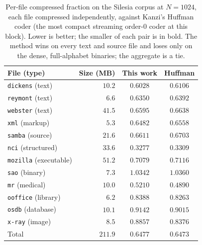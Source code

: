 \documentclass[entropy,article,submit,oneauthor,pdftex]{Definitions/mdpi}
\begin{document}
\begin{table}[ht]
\centering
\renewcommand{\arraystretch}{1.15}
\caption{Per-file compressed fraction on the Silesia corpus at $N{=}1024$, each
file compressed independently, against Kanzi's Huffman coder (the most compact
streaming order-$0$ coder at this block). Lower is better; the smaller of each
pair is in bold. The method wins on every text and source file and loses only on
the dense, full-alphabet binaries; the aggregate is a tie.}
\begin{tabular}{l r c c}
\toprule
\textbf{File (type)} & \textbf{Size (MB)} & \textbf{This work} & \textbf{Huffman} \\
\midrule
\texttt{dickens} (text)       & $10.2$ & $\mathbf{0.6028}$ & $0.6106$ \\
\texttt{reymont} (text)       & $6.6$  & $\mathbf{0.6350}$ & $0.6392$ \\
\texttt{webster} (text)       & $41.5$ & $\mathbf{0.6595}$ & $0.6638$ \\
\texttt{xml} (markup)         & $5.3$  & $\mathbf{0.6482}$ & $0.6558$ \\
\texttt{samba} (source)       & $21.6$ & $\mathbf{0.6611}$ & $0.6703$ \\
\texttt{nci} (structured)     & $33.6$ & $\mathbf{0.3277}$ & $0.3309$ \\
\texttt{mozilla} (executable) & $51.2$ & $\mathbf{0.7079}$ & $0.7116$ \\
\texttt{sao} (binary)         & $7.3$  & $\mathbf{1.0342}$ & $1.0360$ \\
\texttt{mr} (medical)         & $10.0$ & $0.5210$ & $\mathbf{0.4890}$ \\
\texttt{ooffice} (library)    & $6.2$  & $0.8388$ & $\mathbf{0.8263}$ \\
\texttt{osdb} (database)      & $10.1$ & $0.9142$ & $\mathbf{0.9015}$ \\
\texttt{x-ray} (image)        & $8.5$  & $0.8857$ & $\mathbf{0.8376}$ \\
\midrule
Total                         & $211.9$ & $0.6477$ & $\mathbf{0.6473}$ \\
\bottomrule
\end{tabular}
\label{tab:silesia}
\end{table}
\end{document}
